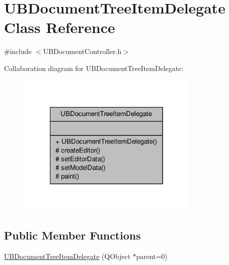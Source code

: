 \hypertarget{class_u_b_document_tree_item_delegate}{\section{U\-B\-Document\-Tree\-Item\-Delegate Class Reference}
\label{d4/da1/class_u_b_document_tree_item_delegate}
}


{\ttfamily \#include $<$U\-B\-Document\-Controller.\-h$>$}



Collaboration diagram for U\-B\-Document\-Tree\-Item\-Delegate\-:
\nopagebreak
\begin{figure}[H]
\begin{center}
\leavevmode
\includegraphics[width=248pt]{d9/db8/class_u_b_document_tree_item_delegate__coll__graph}
\end{center}
\end{figure}
\subsection*{Public Member Functions}
\begin{DoxyCompactItemize}
\item 
\hyperlink{class_u_b_document_tree_item_delegate_ac8548c29cd459a9d0542fea7c335fa92}{U\-B\-Document\-Tree\-Item\-Delegate} (Q\-Object $\ast$parent=0)
\end{DoxyCompactItemize}
